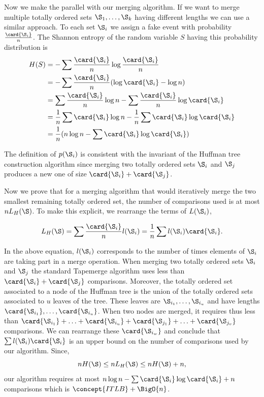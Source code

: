 Now we make the parallel with our merging algorithm. If we want to merge
multiple totally ordered sets \(\S_1,\ldots,\S_k\) having different lengths we can use a similar
approach. To each set \(\S_i\) we assign a fake event with probability
\(\frac{\card{\S_i}}{n}\). The Shannon entropy of the random variable
\(S\) having this probability distribution is
\begin{align}
H(S) &= - \sum \frac{\card{\S_i}}{n} \log \frac{\card{\S_i}}{n}\\
&= - \sum \frac{\card{\S_i}}{n} (\log \card{\S_i} - \log n)\\
&= \sum \frac{\card{\S_i}}{n} \log n - \sum \frac{\card{\S_i}}{n} \log \card{\S_i}\\
&= \frac{1}{n} \sum \card{\S_i} \log n - \frac{1}{n} \sum \card{\S_i} \log
\card{\S_i}\\
&= \frac{1}{n} (n \log n - \sum \card{\S_i} \log \card{\S_i})\\
\end{align}

The definition of \(p(\S_i)\) is consistent with the invariant of
the Huffman tree construction algorithm since merging two totally ordered sets
\(\S_i\) and \(\S_j\) produces a new one of size \(\card{\S_i} + \card{\S_j}\).

Now we prove that for a merging algorithm that would iteratively merge the two
smallest remaining totally ordered set, the number of comparisons used is at
most \(n L_H(\S)\). To make this explicit, we rearrange the terms of \(L(\S_i)\),

\begin{displaymath}
L_H(\S) = \sum \frac{\card{\S_i}}{n} l(\S_i) = \frac{1}{n} \sum l(\S_i) \card{\S_i}.
\end{displaymath}

In the above equation, \(l(\S_i)\) corresponds to the number of times elements
of \(\S_i\) are taking part in a merge operation. When merging two totally
ordered sets \(\S_i\) and \(\S_j\) the standard Tapemerge algorithm uses less
than \(\card{\S_i} + \card{\S_j}\) comparisons. Moreover, the totally ordered set
associated to a node of the Huffman tree is the union of the totally ordered
sets associated to \(u\) leaves of the tree. These leaves are
\(\S_{i_1},\ldots,\S_{i_u}\) and have lengths
\(\card{\S_{i_1}},\ldots,\card{\S_{i_u}}\). When two nodes are merged, it
requires thus less than
\(\card{\S_{i_1}}+\ldots+\card{\S_{i_u}}+\card{\S_{j_1}}+\ldots+\card{\S_{j_v}}\)
comparisons. We can rearrange these \(\card{\S_{i_w}}\) and conclude that
\(\sum l(\S_i) \card{\S_i}\) is an upper bound on the number of comparisons used
by our algorithm. Since,
\begin{displaymath}
n H(\S) \le n L_H(\S) \le n H(\S) + n,
\end{displaymath}
our algorithm requires at most \(n \log n - \sum \card{\S_i} \log \card{\S_i} +
n\) comparisons which is \(\concept{ITLB} + \BigO{n}\).

